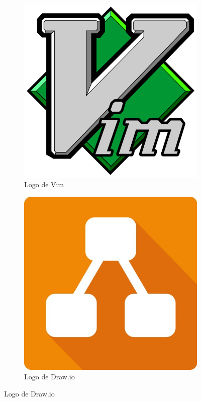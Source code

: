 \begin{figure}[htbp]
    \centering
    \hspace*{\fill}%
    \begin{subfigure}{0.3\textwidth}
        \centering
        \includegraphics[width=\textwidth]{6_implementacion/vim_logo}
        \caption{Logo de Vim}
        \label{fig:vim-logo}
    \end{subfigure}
    \hfill
    \begin{subfigure}{0.3\textwidth}
        \centering
        \includegraphics[width=\textwidth]{6_implementacion/drawio_logo.png}
        \caption{Logo de Draw.io}
        \label{fig:drawio-logo}
    \end{subfigure}
    \hspace*{\fill}%
\end{figure}

